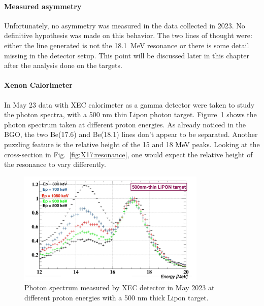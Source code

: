 \begin{refsection}
        \paragraph{Measured asymmetry}
        Unfortunately, no asymmetry was measured in the data collected in 2023.
        No definitive hypothesis was made on this behavior.
        The two lines of thought were: either the line generated is not the \SI{18.1}{MeV} resonance or there is some detail missing in the detector setup.
        This point will be discussed later in this chapter after the analysis done on the targets.
        
        \paragraph{Xenon Calorimeter} 
        In May 23 data with XEC calorimeter as a gamma detector were taken to study the photon spectra, with a 500 nm thin Lipon photon target.
        Figure~\ref{fig:xecspectrum} shows the photon spectrum taken at different proton energies. As already noticed in the BGO, the two Be(17.6) and Be(18.1) lines don't appear to be separated.
        Another puzzling feature is the relative height of the 15 and 18 MeV peaks.
        Looking at the cross-section in Fig.~\ref{fig:X17:resonance}, one would expect the relative height of the resonance to vary differently.
        
        \begin{figure}[]
            \centering
            \includegraphics[width = 0.8\textwidth]{Figures/X17/X17_XEC_2023.pdf}
            \caption[X17: XEC data in May 2023]{Photon spectrum measured by XEC detector in May 2023 at different proton energies with a 500 nm thick Lipon target.}
            \label{fig:xecspectrum}
        \end{figure}


\end{refsection}
